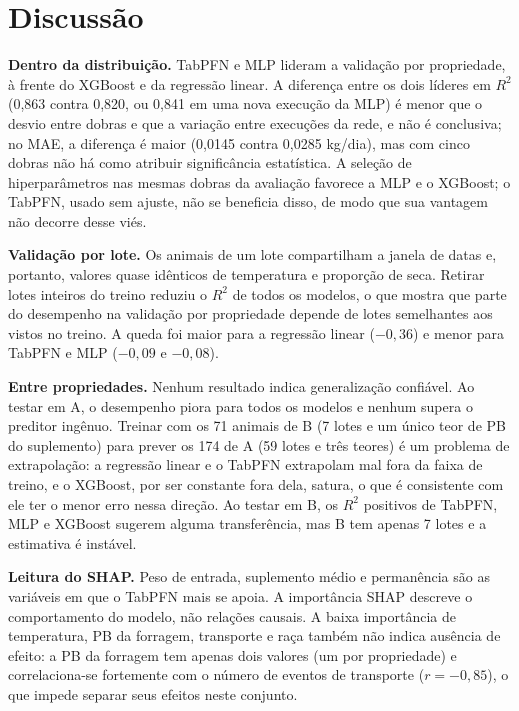 \documentclass[conference]{IEEEtran}
\begin{document}
\section{Discussão}\label{sec:disc}

\textbf{Dentro da distribuição.} TabPFN e MLP lideram a validação por propriedade, à frente do XGBoost e da regressão linear. A diferença entre os dois líderes em $R^2$ (0,863 contra 0,820, ou 0,841 em uma nova execução da MLP) é menor que o desvio entre dobras e que a variação entre execuções da rede, e não é conclusiva; no MAE, a diferença é maior (0,0145 contra 0,0285 kg/dia), mas com cinco dobras não há como atribuir significância estatística. A seleção de hiperparâmetros nas mesmas dobras da avaliação favorece a MLP e o XGBoost; o TabPFN, usado sem ajuste, não se beneficia disso, de modo que sua vantagem não decorre desse viés.

\textbf{Validação por lote.} Os animais de um lote compartilham a janela de datas e, portanto, valores quase idênticos de temperatura e proporção de seca. Retirar lotes inteiros do treino reduziu o $R^2$ de todos os modelos, o que mostra que parte do desempenho na validação por propriedade depende de lotes semelhantes aos vistos no treino. A queda foi maior para a regressão linear ($-0{,}36$) e menor para TabPFN e MLP ($-0{,}09$ e $-0{,}08$).

\textbf{Entre propriedades.} Nenhum resultado indica generalização confiável. Ao testar em A, o desempenho piora para todos os modelos e nenhum supera o preditor ingênuo. Treinar com os 71 animais de B (7 lotes e um único teor de PB do suplemento) para prever os 174 de A (59 lotes e três teores) é um problema de extrapolação: a regressão linear e o TabPFN extrapolam mal fora da faixa de treino, e o XGBoost, por ser constante fora dela, satura, o que é consistente com ele ter o menor erro nessa direção. Ao testar em B, os $R^2$ positivos de TabPFN, MLP e XGBoost sugerem alguma transferência, mas B tem apenas 7 lotes e a estimativa é instável.

\textbf{Leitura do SHAP.} Peso de entrada, suplemento médio e permanência são as variáveis em que o TabPFN mais se apoia. A importância SHAP descreve o comportamento do modelo, não relações causais. A baixa importância de temperatura, PB da forragem, transporte e raça também não indica ausência de efeito: a PB da forragem tem apenas dois valores (um por propriedade) e correlaciona-se fortemente com o número de eventos de transporte ($r=-0{,}85$), o que impede separar seus efeitos neste conjunto.
\end{document}
